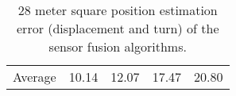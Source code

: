 \begin{table}[H]
\begin{center}
{\begin{tabular}[t]{lcccc}
                \hline
                Average          & 10.14                   & 12.07                  & 17.47           & 20.80
            \end{tabular}
        }
        \caption{28 meter square position estimation error (displacement and turn) of the sensor fusion algorithms. }
        \label{tab:28_triangle}
    \end{center}
\end{table}